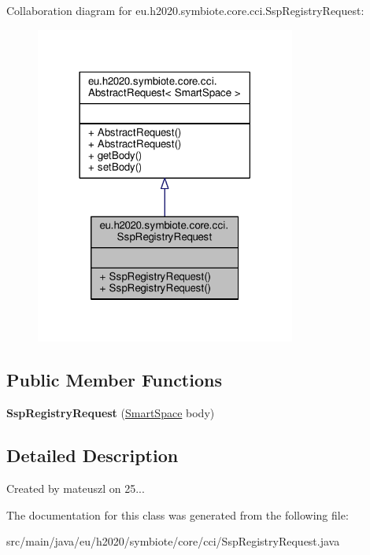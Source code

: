 Collaboration diagram for eu.\+h2020.\+symbiote.\+core.\+cci.\+Ssp\+Registry\+Request\+:\nopagebreak
\begin{figure}[H]
\begin{center}
\leavevmode
\includegraphics[width=242pt]{classeu_1_1h2020_1_1symbiote_1_1core_1_1cci_1_1SspRegistryRequest__coll__graph}
\end{center}
\end{figure}
\subsection*{Public Member Functions}
\begin{DoxyCompactItemize}
\item 
\mbox{\label{classeu_1_1h2020_1_1symbiote_1_1core_1_1cci_1_1SspRegistryRequest_a2278828b8cb4a4e13772792ef3bf1c93}} 
{\bfseries Ssp\+Registry\+Request} (\hyperlink{classeu_1_1h2020_1_1symbiote_1_1model_1_1mim_1_1SmartSpace}{Smart\+Space} body)
\end{DoxyCompactItemize}


\subsection{Detailed Description}
Created by mateuszl on 25... 

The documentation for this class was generated from the following file\+:\begin{DoxyCompactItemize}
\item 
src/main/java/eu/h2020/symbiote/core/cci/Ssp\+Registry\+Request.\+java\end{DoxyCompactItemize}
